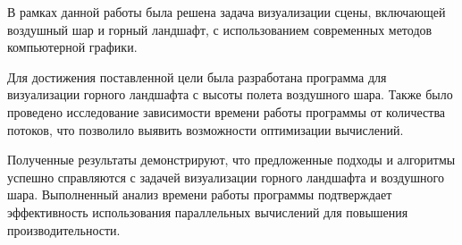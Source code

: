 
В рамках данной работы была решена задача визуализации сцены, включающей воздушный шар и горный ландшафт, с использованием современных методов компьютерной графики.

Для достижения поставленной цели была разработана программа для визуализации горного ландшафта с высоты полета воздушного шара. Также было проведено исследование зависимости времени работы программы от количества потоков, что позволило выявить возможности оптимизации вычислений.

Полученные результаты демонстрируют, что предложенные подходы и алгоритмы успешно справляются с задачей визуализации горного ландшафта и воздушного шара. Выполненный анализ времени работы программы подтверждает эффективность использования параллельных вычислений для повышения производительности.

\renewcommand\bibname{СПИСОК ИСПОЛЬЗОВАННЫХ ИСТОЧНИКОВ}




